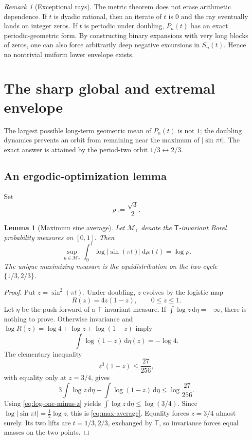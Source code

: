 \documentclass[11pt,oneside]{article}
\newtheorem{lemma}[theorem]{Lemma}
\theoremstyle{definition}
\theoremstyle{remark}
\newtheorem{remark}[theorem]{Remark}
\newcommand{\dd}{\,\mathrm d}
\newcommand{\T}{\mathsf T}
\begin{document}
\begin{remark}[Exceptional rays]
The metric theorem does not erase arithmetic dependence.  If $t$ is dyadic rational,
then an iterate of $t$ is $0$ and the ray eventually lands on integer zeros.  If $t$ is
periodic under doubling, $P_n(t)$ has an exact periodic-geometric form.  By constructing
binary expansions with very long blocks of zeros, one can also force arbitrarily deep
negative excursions in $S_n(t)$.  Hence no nontrivial uniform lower envelope exists.
\end{remark}

\section{The sharp global and extremal envelope}\label{sec:extremal}

The largest possible long-term geometric mean of $P_n(t)$ is not $1$; the doubling
dynamics prevents an orbit from remaining near the maximum of $|\sin\pi t|$.  The exact
answer is attained by the period-two orbit $1/3\leftrightarrow2/3$.

\subsection{An ergodic-optimization lemma}

Set
\begin{equation}\label{eq:rho}
 \rho:=\frac{\sqrt3}{2}.
\end{equation}

\begin{lemma}[Maximum sine average]\label{lem:max-average}
Let $\mathcal M_\T$ denote the $\T$-invariant Borel probability measures on $[0,1]$.
Then
\begin{equation}\label{eq:max-average}
 \sup_{\mu\in\mathcal M_\T}
 \int_0^1\log|\sin(\pi t)|\dd\mu(t)
 =\log\rho.
\end{equation}
The unique maximizing measure is the equidistribution on the two-cycle
$\{1/3,2/3\}$.
\end{lemma}

\begin{proof}
Put $z=\sin^2(\pi t)$.  Under doubling, $z$ evolves by the logistic map
\[
 R(z)=4z(1-z),\qquad 0\le z\le1.
\]
Let $\eta$ be the push-forward of a $\T$-invariant measure.  If
$\int\log z\dd\eta=-\infty$, there is nothing to prove.  Otherwise invariance and
$\log R(z)=\log4+\log z+\log(1-z)$ imply
\begin{equation}\label{eq:log-one-minus-z}
 \int\log(1-z)\dd\eta(z)=-\log4.
\end{equation}
The elementary inequality
\begin{equation}\label{eq:z-inequality}
 z^3(1-z)\le\frac{27}{256},
\end{equation}
with equality only at $z=3/4$, gives
\[
 3\int\log z\dd\eta+\int\log(1-z)\dd\eta
 \le\log\frac{27}{256}.
\]
Using \eqref{eq:log-one-minus-z} yields
$\int\log z\dd\eta\le\log(3/4)$.  Since
$\log|\sin\pi t|=\tfrac12\log z$, this is \eqref{eq:max-average}.
Equality forces $z=3/4$ almost surely.  Its two lifts are $t=1/3,2/3$, exchanged by
$\T$, so invariance forces equal masses on the two points.
\end{proof}
\end{document}
